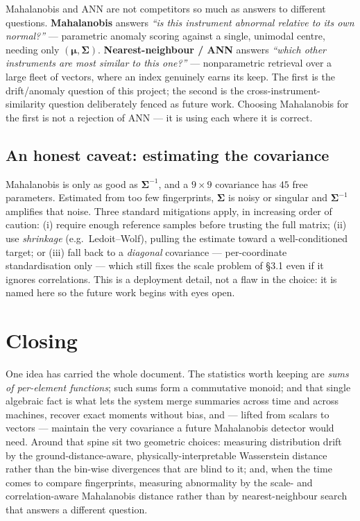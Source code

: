 \documentclass[11pt]{article}
\theoremstyle{definition}
\newcommand{\Cov}{\boldsymbol{\Sigma}}
\begin{document}
\begin{tcolorbox}[keybox, title={Two different questions --- be precise about which}]
Mahalanobis and ANN are not competitors so much as answers to different questions.
\textbf{Mahalanobis} answers \emph{``is this instrument abnormal relative to its own normal?''} ---
parametric anomaly scoring against a single, unimodal centre, needing only $(\boldsymbol{\mu},\Cov)$.
\textbf{Nearest-neighbour / ANN} answers \emph{``which other instruments are most similar to this
one?''} --- nonparametric retrieval over a large fleet of vectors, where an index genuinely earns its
keep. The first is the drift/anomaly question of this project; the second is the
cross-instrument-similarity question deliberately fenced as future work. Choosing Mahalanobis for the
first is not a rejection of ANN --- it is using each where it is correct.
\end{tcolorbox}

\subsection{An honest caveat: estimating the covariance}

Mahalanobis is only as good as $\Cov^{-1}$, and a $9 \times 9$ covariance has $45$ free parameters.
Estimated from too few fingerprints, $\Cov$ is noisy or singular and $\Cov^{-1}$ amplifies that noise.
Three standard mitigations apply, in increasing order of caution: (i) require enough reference
samples before trusting the full matrix; (ii) use \emph{shrinkage} (e.g.\ Ledoit--Wolf), pulling the
estimate toward a well-conditioned target; or (iii) fall back to a \emph{diagonal} covariance ---
per-coordinate standardisation only --- which still fixes the scale problem of \S3.1 even if it
ignores correlations. This is a deployment detail, not a flaw in the choice: it is named here so the
future work begins with eyes open.

\section*{Closing}

One idea has carried the whole document. The statistics worth keeping are \emph{sums of per-element
functions}; such sums form a commutative monoid; and that single algebraic fact is what lets the
system merge summaries across time and across machines, recover exact moments without bias, and ---
lifted from scalars to vectors --- maintain the very covariance a future Mahalanobis detector would
need. Around that spine sit two geometric choices: measuring distribution drift by the
ground-distance-aware, physically-interpretable Wasserstein distance rather than the bin-wise
divergences that are blind to it; and, when the time comes to compare fingerprints, measuring
abnormality by the scale- and correlation-aware Mahalanobis distance rather than by nearest-neighbour
search that answers a different question.
\end{document}
